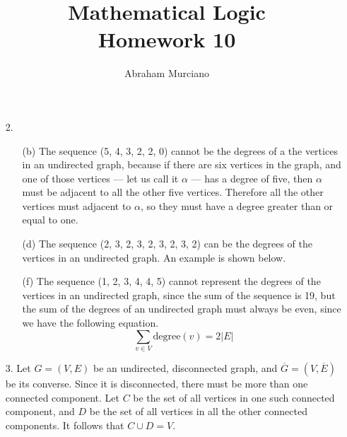 \documentclass[fleqn]{article}
\title{Mathematical Logic \\
\large Homework 10}
\author{Abraham Murciano}
\begin{document}
\maketitle

\begin{enumerate}

    \item[2.]
    \begin{enumerate}
		\item[(b)]
		The sequence (5, 4, 3, 2, 2, 0) cannot be the degrees of a the vertices in an undirected graph, because if there are six vertices in the graph, and one of those vertices --- let us call it \(\alpha\) --- has a degree of five, then \(\alpha\) must be adjacent to all the other five vertices. Therefore all the other vertices must adjacent to \(\alpha\), so they must have a degree greater than or equal to one.

		\item[(d)]
		The sequence (2, 3, 2, 3, 2, 3, 2, 3, 2) can be the degrees of the vertices in an undirected graph. An example is shown below.
		\begin{figure}[h]
			\centering
		\end{figure}

		\item[(f)]
		The sequence (1, 2, 3, 4, 4, 5) cannot represent the degrees of the vertices in an undirected graph, since the sum of the sequence is 19, but the sum of the degrees of an undirected graph must always be even, since we have the following equation.
		\[\sum_{v \in V}\text{degree}(v) = 2|E|\]
	\end{enumerate}

	\bigskip
	\item[3.]
	Let \(G = (V, E)\) be an undirected, disconnected graph, and \(\overline{G} = (V, \overline{E})\) be its converse. Since it is disconnected, there must be more than one connected component. Let \(C\) be the set of all vertices in one such connected component, and \(D\) be the set of all vertices in all the other connected components. It follows that \(C \cup D = V\).


\end{enumerate}
\end{document}
